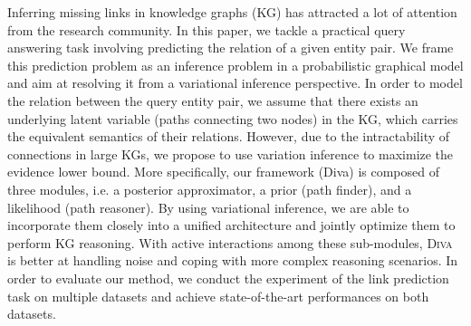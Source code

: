 Inferring missing links in knowledge graphs (KG) has attracted a lot of attention from the research community. In this paper, we tackle a practical query answering task involving predicting the relation of a given entity pair. We frame this prediction problem as an inference problem in a probabilistic graphical model and aim at resolving it from a variational inference perspective. In order to model the relation between the query entity pair, we assume that there exists an underlying latent variable (paths connecting two nodes) in the KG, which carries the equivalent semantics of their relations. However, due to the intractability of connections in large KGs, we propose to use variation inference to maximize the evidence lower bound. More specifically, our framework (Diva) is composed of three modules, i.e. a posterior approximator, a prior (path finder), and a likelihood (path reasoner). By using variational inference, we are able to incorporate them closely into a unified architecture and jointly optimize them to perform KG reasoning. With active interactions among these sub-modules, \textsc{Diva} is better at handling noise and coping with more complex reasoning scenarios. In order to evaluate our method, we conduct the experiment of the link prediction task on multiple datasets and achieve state-of-the-art performances on both datasets.
